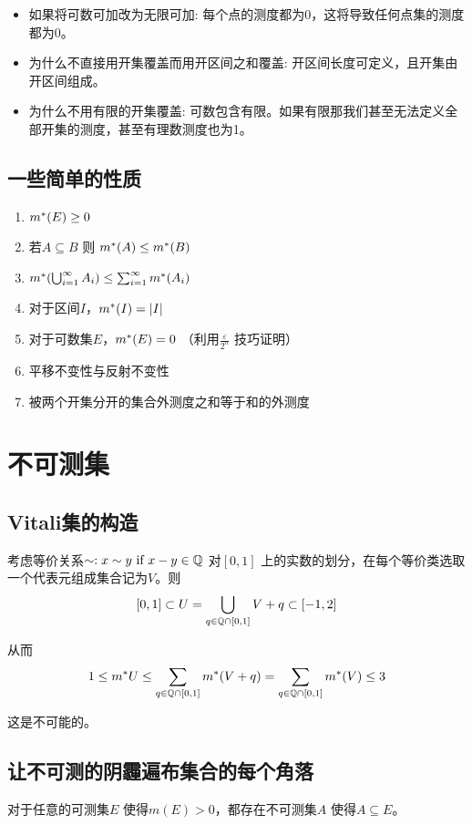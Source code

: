 \begin{itemize}
    \item 如果将可数可加改为无限可加: 每个点的测度都为0，这将导致任何点集的测度都为0。
    \item 为什么不直接用开集覆盖而用开区间之和覆盖: 开区间长度可定义，且开集由开区间组成。
    \item 为什么不用有限的开集覆盖: 可数包含有限。如果有限那我们甚至无法定义全部开集的测度，甚至有理数测度也为1。
\end{itemize}

\subsection{一些简单的性质}
\begin{enumerate}
    \item \(m^{*}(E)\geq 0\)
    \item 若\(A \subseteq B\) 则 \(m^{*}(A) \leq m^{*}(B)\)
    \item \(m^{*}(\bigcup_{i=1}^{\infty} A_{i}) \leq
        \sum_{i=1}^{\infty} m^{*}(A_{i})\)
    \item 对于区间\(I\)，\(m^{*}(I) = |I|\)
    \item 对于可数集\(E\)，\(m^{*}(E) = 0\)
        （利用\(\frac{\varepsilon}{2^{n}}\) 技巧证明）
    \item 平移不变性与反射不变性
    \item 被两个开集分开的集合外测度之和等于和的外测度

\end{enumerate}

\section{不可测集}

\subsection{Vitali集的构造}
考虑等价关系\(\sim: x\sim y \text{ if } x-y \in \mathbb{Q}\) 对\([0,1]\)
上的实数的划分，在每个等价类选取一个代表元组成集合记为\(V\)。则\[
    [0,1] \subset U=\bigcup_{q \in \mathbb{Q}\cap[0,1]} V+q \subset [-1,2]
\]

从而\[
    1\leq m^{*} U \leq \sum_{q \in \mathbb{Q}\cap[0,1]} m^{*}(V+q) = \sum_{q \in
    \mathbb{Q}\cap[0,1]} m^{*}(V) \leq 3
\]

这是不可能的。

\subsection{让不可测的阴霾遍布集合的每个角落}
\begin{theorem}
    对于任意的可测集\(E\) 使得\(m(E)>0\)，都存在不可测集\(A\) 使得\(A \subseteq E\)。
\end{theorem}

